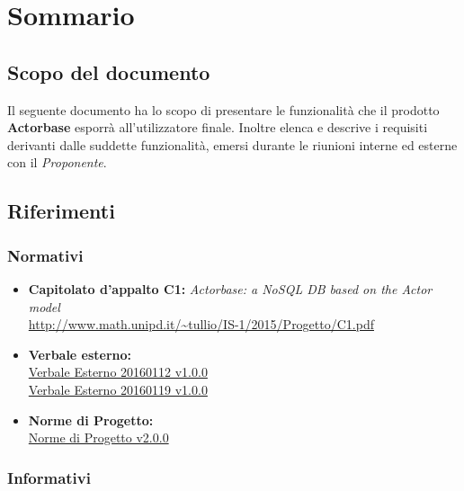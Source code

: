 \documentclass{scalatekids-article}
\begin{document}
\section{Sommario}

\subsection{Scopo del documento}

Il seguente documento ha lo scopo di presentare le funzionalità che il prodotto
\textbf{Actorbase} esporrà all'utilizzatore finale. Inoltre elenca e descrive i
requisiti derivanti dalle suddette funzionalità, emersi durante le riunioni
interne ed esterne con il \textit{Proponente}.
\prodPurpose{}\glossExpl{}

\subsection{Riferimenti}

\subsubsection{Normativi}

\begin{itemize}
\item\textbf{Capitolato d'appalto C1:} \textit{Actorbase: a NoSQL DB based on the Actor model}\\
  \url{http://www.math.unipd.it/~tullio/IS-1/2015/Progetto/C1.pdf}
\item\textbf{Verbale esterno:}\\
  \href{run:../RR/Interni/VerbaleEsterno20160112\_v1.0.0.pdf}{Verbale Esterno 20160112 v1.0.0}\\
  \href{run:../RR/Interni/VerbaleEsterno20160119\_v1.0.0.pdf}{Verbale Esterno 20160119 v1.0.0}
\item\textbf{Norme di Progetto:}\\
  \href{run:../Interni/NormeDiProgetto\_v2.0.0.pdf}{Norme di Progetto v2.0.0}
\end{itemize}

\subsubsection{Informativi}
\end{document}
